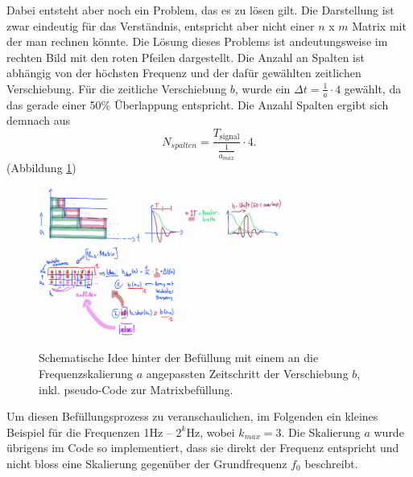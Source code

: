 Dabei entsteht aber noch ein Problem, das es zu lösen gilt. Die Darstellung ist zwar eindeutig für das Verständnis, entspricht aber nicht einer $n$ x $m$ Matrix mit der man rechnen könnte.
Die Lösung dieses Problems ist andeutungsweise im rechten Bild mit den roten Pfeilen dargestellt. Die Anzahl an Spalten ist abhängig von der höchsten Frequenz und der dafür gewählten zeitlichen Verschiebung.
Für die zeitliche Verschiebung $b$, wurde ein $\Delta t=\frac{1}{a}\cdot4$ gewählt, da das gerade einer 50\% Überlappung entspricht. Die Anzahl Spalten ergibt sich demnach aus \[N_{spalten}=\frac{T_\text{signal}}{\frac{1}{a_{max}}}\cdot4.\] (Abbildung \ref{wavelet:fig:filterbankFillUp})

\begin{figure}
	\centering
	\includegraphics[width=0.3\textwidth]{papers/wavelets/images/16-1_filterbankFillUp_1.png}
	\includegraphics[width=0.4\textwidth]{papers/wavelets/images/16-2_filterbankFillUp_2.png}
	\includegraphics[width=0.4\textwidth]{papers/wavelets/images/16-3_filterbankFillUp_3.png}
	\caption{Schematische Idee hinter der Befüllung mit einem an die Frequenzskalierung $a$ angepassten Zeitschritt der Verschiebung $b$, inkl. pseudo-Code zur Matrixbefüllung.}
	\label{wavelet:fig:filterbankFillUp}
\end{figure}

Um diesen Befüllungsprozess zu veranschaulichen, im Folgenden ein kleines Beispiel für die Frequenzen 1Hz – $2^k$Hz, wobei $k_{max} = 3$. Die Skalierung $a$ wurde übrigens im Code so implementiert, dass sie direkt der Frequenz entspricht und nicht bloss eine Skalierung gegenüber der Grundfrequenz $f_0$ beschreibt. 


